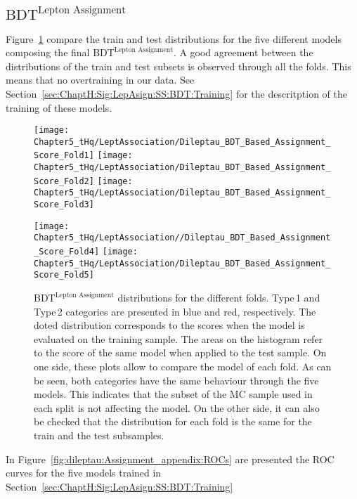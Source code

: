 \subsection{$\text{BDT}^{\text{Lepton Assignment}}$}
\label{sec:BDT:AdditionalMaterial:Assignment}
Figure~\ref{fig:dileptau:Assignment_appendix:ScoreDistributions} compare the train and test
distributions for the five different models composing the final $\text{BDT}^{\text{Lepton Assignment}}$.
A good agreement between the distributions of the train and test subsets is observed through all
the folds. This means that no overtraining in our data.
See Section~\ref{sec:ChaptH:Sig:LepAsign:SS:BDT:Training} for the descritption
of the training of these models.

\begin{figure}[h]
\centering
\texttt{[image: Chapter5\_tHq/LeptAssociation/Dileptau\_BDT\_Based\_Assignment\_Score\_Fold1]}\quad
\texttt{[image: Chapter5\_tHq/LeptAssociation/Dileptau\_BDT\_Based\_Assignment\_Score\_Fold2]}
\medskip
\texttt{[image: Chapter5\_tHq/LeptAssociation/Dileptau\_BDT\_Based\_Assignment\_Score\_Fold3]}\quad

\texttt{[image: Chapter5\_tHq/LeptAssociation//Dileptau\_BDT\_Based\_Assignment\_Score\_Fold4]}
\medskip
\texttt{[image: Chapter5\_tHq/LeptAssociation/Dileptau\_BDT\_Based\_Assignment\_Score\_Fold5]}
\caption{$\text{BDT}^{\text{Lepton Assignment}}$ distributions for the different folds.
 Type$\,$1 and Type$\,$2 categories are presented in blue and red, respectively.
The doted distribution corresponds to the scores when the model is evaluated on the
training sample. The areas on the histogram refer to the score of the same model when
applied to the test sample. 
On one side, these plots allow to compare the model of each fold. As can be seen,
both categories have the same behaviour through the five models. This indicates
that the subset of the MC sample used in each split is not affecting the model.
On the other side, it can also be checked that the distribution for each fold
is the same for the train and the test subsamples.}
\label{fig:dileptau:Assignment_appendix:ScoreDistributions}
\end{figure}

In Figure~\ref{fig:dileptau:Assignment_appendix:ROCs} are presented the ROC curves for the five models
trained in Section~\ref{sec:ChaptH:Sig:LepAsign:SS:BDT:Training}
 

